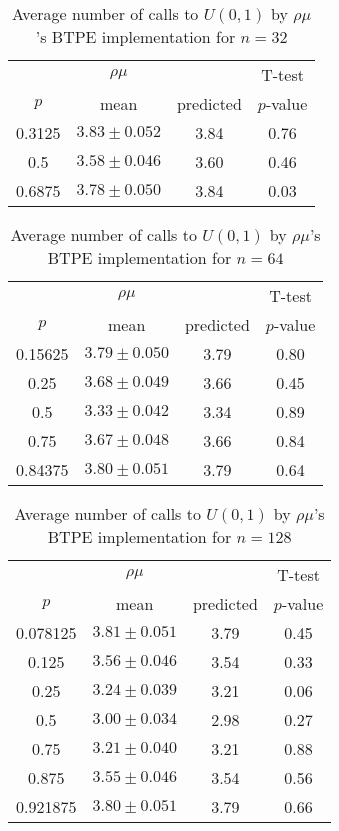 \begin{table}[t]
\caption{Average number of calls to $U(0,1)$ by $\rho\mu$'s BTPE implementation for $n=32$}
\label{tab:calls32}
\begin{tabular}{cccc} \hline
    & $\rho\mu$ & & T-test \\
$p$ & mean & predicted & $p$-value \\ \hline
0.3125       & $3.83 \pm 0.052$ & 3.84 & 0.76 \\
0.5          & $3.58 \pm 0.046$ & 3.60 & 0.46 \\
0.6875       & $3.78 \pm 0.050$ & 3.84 & 0.03 \\
\hline
\end{tabular}
\end{table}

\begin{table}[t]
\caption{Average number of calls to $U(0,1)$ by $\rho\mu$'s BTPE implementation for $n=64$}
\label{tab:calls64}
\begin{tabular}{cccc} \hline
    & $\rho\mu$ & & T-test \\
$p$ & mean & predicted & $p$-value \\ \hline
0.15625      & $3.79 \pm 0.050$ & 3.79 & 0.80 \\
0.25         & $3.68 \pm 0.049$ & 3.66 & 0.45 \\
0.5          & $3.33 \pm 0.042$ & 3.34 & 0.89 \\
0.75         & $3.67 \pm 0.048$ & 3.66 & 0.84 \\
0.84375      & $3.80 \pm 0.051$ & 3.79 & 0.64 \\
\hline
\end{tabular}
\end{table}

\begin{table}[t]
\caption{Average number of calls to $U(0,1)$ by $\rho\mu$'s BTPE implementation for $n=128$}
\label{tab:calls128}
\begin{tabular}{cccc} \hline
    & $\rho\mu$ & & T-test \\
$p$ & mean & predicted & $p$-value \\ \hline
0.078125     & $3.81 \pm 0.051$ & 3.79 & 0.45 \\
0.125        & $3.56 \pm 0.046$ & 3.54 & 0.33 \\
0.25         & $3.24 \pm 0.039$ & 3.21 & 0.06 \\
0.5          & $3.00 \pm 0.034$ & 2.98 & 0.27 \\
0.75         & $3.21 \pm 0.040$ & 3.21 & 0.88 \\
0.875        & $3.55 \pm 0.046$ & 3.54 & 0.56 \\
0.921875     & $3.80 \pm 0.051$ & 3.79 & 0.66 \\
\hline
\end{tabular}
\end{table}

